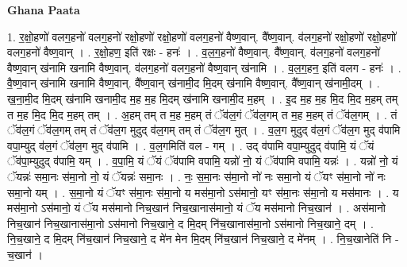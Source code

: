 \documentclass[17pt]{extarticle}
\begin{document}
\textbf{Ghana Paata } \newline

1. र॒क्षो॒हणो॑ वलग॒हनो॑ वलग॒हनो॑ रक्षो॒हणो॑ रक्षो॒हणो॑ वलग॒हनो॑ वैष्ण॒वान्. वै᳚ष्ण॒वान्. व॑लग॒हनो॑ रक्षो॒हणो॑ रक्षो॒हणो॑ वलग॒हनो॑ वैष्ण॒वान् । . र॒क्षो॒हण॒ इति॑ रक्षः - हनः॑ । . व॒ल॒ग॒हनो॑ वैष्ण॒वान्. वै᳚ष्ण॒वान्. व॑लग॒हनो॑ वलग॒हनो॑ वैष्ण॒वान् ख॑नामि खनामि वैष्ण॒वान्. व॑लग॒हनो॑ वलग॒हनो॑ वैष्ण॒वान् ख॑नामि । . व॒ल॒ग॒हन॒ इति॑ वलग - हनः॑ । . वै॒ष्ण॒वान् ख॑नामि खनामि वैष्ण॒वान्. वै᳚ष्ण॒वान् ख॑नामी॒द मि॒दम् ख॑नामि वैष्ण॒वान्. वै᳚ष्ण॒वान् ख॑नामी॒दम् । . ख॒ना॒मी॒द मि॒दम् ख॑नामि खनामी॒द म॒ह म॒ह मि॒दम् ख॑नामि खनामी॒द म॒हम् । . इ॒द म॒ह म॒ह मि॒द मि॒द म॒हम् तम् त म॒ह मि॒द मि॒द म॒हम् तम् । . अ॒हम् तम् त म॒ह म॒हम् तं ॅव॑ल॒गं ॅव॑ल॒गम् त म॒ह म॒हम् तं ॅव॑ल॒गम् । . तं ॅव॑ल॒गं ॅव॑ल॒गम् तम् तं ॅव॑ल॒ग मुदुद् व॑ल॒गम् तम् तं ॅव॑ल॒ग मुत् । . व॒ल॒ग मुदुद् व॑ल॒गं ॅव॑ल॒ग मुद् व॑पामि वपा॒म्युद् व॑ल॒गं ॅव॑ल॒ग मुद् व॑पामि । . व॒ल॒गमिति॑ वल - गम् । . उद् व॑पामि वपा॒म्युदुद् व॑पामि॒ यं ॅयं ॅव॑पा॒म्युदुद् व॑पामि॒ यम् । . व॒पा॒मि॒ यं ॅयं ॅव॑पामि वपामि॒ यन्नो॑ नो॒ यं ॅव॑पामि वपामि॒ यन्नः॑ । . यन्नो॑ नो॒ यं ॅयन्नः॑ समा॒नः स॑मा॒नो नो॒ यं ॅयन्नः॑ समा॒नः । . नः॒ स॒मा॒नः स॑मा॒नो नो॑ नः समा॒नो यं ॅयꣳ स॑मा॒नो नो॑ नः समा॒नो यम् । . स॒मा॒नो यं ॅयꣳ स॑मा॒नः स॑मा॒नो य मस॑मा॒नो ऽस॑मानो॒ यꣳ स॑मा॒नः स॑मा॒नो य मस॑मानः । . य मस॑मा॒नो ऽस॑मानो॒ यं ॅय मस॑मानो निच॒खान॑ निच॒खानास॑मानो॒ यं ॅय मस॑मानो निच॒खान॑ । . अस॑मानो निच॒खान॑ निच॒खानास॑मा॒नो ऽस॑मानो निच॒खाने॒ द मि॒दम् नि॑च॒खानास॑मा॒नो ऽस॑मानो निच॒खाने॒ दम् । . नि॒च॒खाने॒ द मि॒दम् नि॑च॒खान॑ निच॒खाने॒ द मे॑न मेन मि॒दम् नि॑च॒खान॑ निच॒खाने॒ द मे॑नम् । . नि॒च॒खानेति॑ नि - च॒खान॑ । \newline
\end{document}
